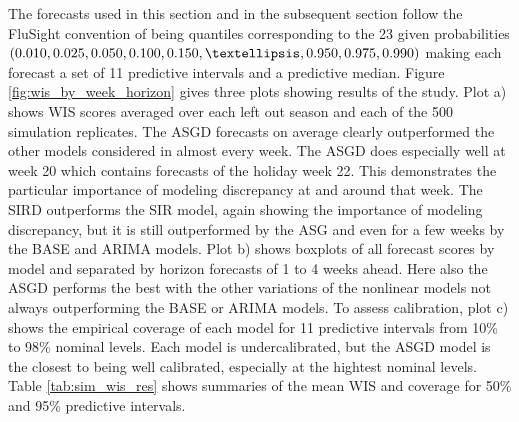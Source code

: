 




The forecasts used in this section and in the subsequent section follow the 
FluSight convention of being quantiles corresponding to the 23 given 
probabilities $\\(0.010, 0.025, 0.050, 0.100, 0.150, …, 0.950, 0.975, 0.990)$
making each forecast a set of 11 predictive intervals and a predictive median.
Figure \ref{fig:wis_by_week_horizon} gives three plots showing results of the 
study. Plot a) shows WIS scores averaged over each left out season and each 
of the 500 simulation replicates. The ASGD forecasts on average clearly 
outperformed the other models considered in almost every week. The ASGD does
especially well at week 20 which contains forecasts of the holiday week 22. 
This demonstrates the
particular importance of modeling discrepancy at and around that 
week. The SIRD outperforms the SIR model, again showing the importance of 
modeling discrepancy, but it is still outperformed by the ASG and even for a
few weeks by the BASE and ARIMA models. Plot b) shows boxplots of all forecast
scores by model and separated by horizon forecasts of 1 to 4 weeks ahead. Here
also the ASGD performs the best with the other variations of the 
nonlinear models not always outperforming the BASE or ARIMA models. 
To assess calibration, plot c)
shows the empirical coverage of each model for 11 predictive intervals from 
10\% to 98\% nominal levels. Each model is undercalibrated, but the ASGD 
model is the closest to being well calibrated, especially at the hightest 
nominal levels. Table \ref{tab:sim_wis_res} shows summaries of the mean WIS and
coverage for 50\% and 95\% predictive intervals.



